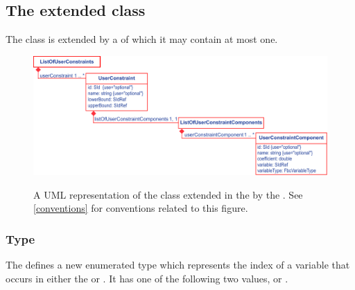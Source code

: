 
\subsection{The extended  class}
\label{model-class-kv}

The \SBML \Model class is extended by a  of which it may contain at most one.
%
\begin{figure}[ht]
  \centering
  \includegraphics[width=\textwidth]{images/fbc_v3_uml_userconstraint.pdf}\\
  \caption{A UML representation of the \SBML \Model class extended in
  the \FBCPackage by the \ListOfUserConstraints. See \ref{conventions} for conventions related to this figure.}
  \label{fig:fbc_v3_uml_user_constraints}
\end{figure}

\subsubsection{Type }
\label{primtype-fbcvariabletype}

The \FBCPackage defines a new enumerated type  which
represents the index of a variable that occurs in either the \FluxObjective or \UserConstraintComponent. It has one of the following two values,  or .


%

